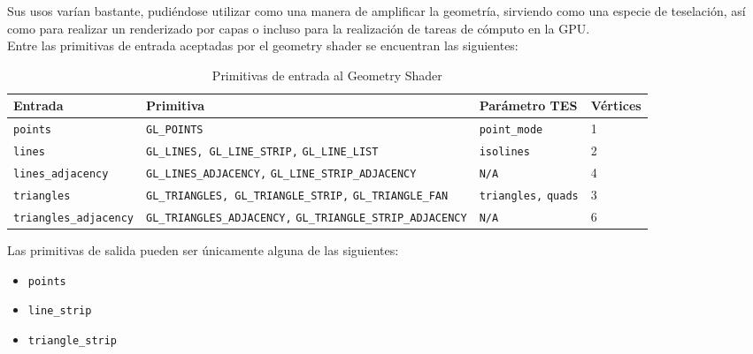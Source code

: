 Sus usos varían bastante, pudiéndose utilizar como una manera de amplificar la
geometría, sirviendo como una especie de teselación, así como para realizar un
renderizado por capas o incluso para la realización de tareas de cómputo en la
GPU. \\

Entre las primitivas de entrada aceptadas por el geometry shader se encuentran
las siguientes:

\begin{table}[h]
		\begin{tabular}{|m{4cm}|m{7cm}|m{2.2cm}|m{1.5cm}|}

			\hline
			Entrada & Primitiva & Parámetro TES & Vértices\\
			\hline

			\verb|points| & \verb|GL_POINTS| & \verb|point_mode| & 1 \\
			\hline

			\verb|lines| & \verb|GL_LINES, GL_LINE_STRIP,| \verb|GL_LINE_LIST| &
			\verb|isolines| & 2\\

			\hline

			\verb|lines_adjacency| & \verb|GL_LINES_ADJACENCY,|
			\verb|GL_LINE_STRIP_ADJACENCY| & \verb|N/A| & 4\\

			\hline

			\verb|triangles| & \verb|GL_TRIANGLES, GL_TRIANGLE_STRIP,|
			\verb|GL_TRIANGLE_FAN| & \verb|triangles,| \verb|quads| & 3 \\

			\hline

			\verb|triangles_adjacency| & \verb|GL_TRIANGLES_ADJACENCY,|
			\verb|GL_TRIANGLE_STRIP_ADJACENCY| & \verb|N/A| & 6 \\

			\hline
		\end{tabular}
		\caption{Primitivas de entrada al Geometry Shader}
		\label{tabla3.1}
\end{table}

Las primitivas de salida pueden ser únicamente alguna de las siguientes:

\begin{itemize}
		\item \verb|points|	
		\item \verb|line_strip|
		\item \verb|triangle_strip|
\end{itemize}

